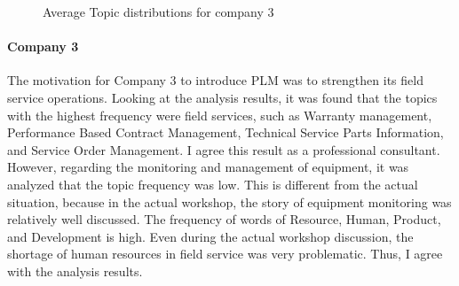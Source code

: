 \documentclass[senior]{IPSstyle}
\begin{document}
\begin{figure}[h]
    \begin{center}
    \end{center}
\vspace{-0.3cm}
    \caption{Average Topic distributions for company 3}
    \label{fig_c3}
    \vspace{-0.3cm}
\end{figure} 

\paragraph{Company 3} The motivation for Company 3 to introduce PLM was to strengthen its field service operations. Looking at the analysis results, it was found that the topics with the highest frequency were field services, such as Warranty management, Performance Based Contract Management, Technical Service Parts Information, and Service Order Management. I agree this result as a professional consultant. However, regarding the monitoring and management of equipment, it was analyzed that the topic frequency was low. This is different from the actual situation, because in the actual workshop, the story of equipment monitoring was relatively well discussed. The frequency of words of Resource, Human, Product, and Development is high. Even during the actual workshop discussion, the shortage of human resources in field service was very problematic. Thus, I agree with the analysis results.
\end{document}
